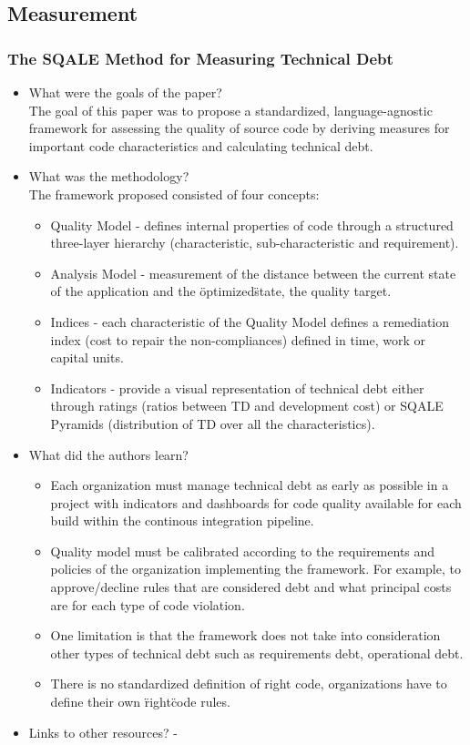 \documentclass{mprop}
\begin{document}
\subsection{Measurement}

\subsubsection{The SQALE Method for Measuring Technical Debt} \cite{Letouzey2012}

\begin{itemize}
	\item What were the goals of the paper? \\
		The goal of this paper was to propose a standardized, language-agnostic framework for assessing the quality of source code by deriving measures for important code characteristics and calculating technical debt.
	\item What was the methodology? \\
		The framework proposed consisted of four concepts:
		\begin{itemize}
			\item Quality Model - defines internal properties of code through a structured three-layer hierarchy (characteristic, sub-characteristic and requirement).
			\item Analysis Model - measurement of the distance between the current state of the application and the \"optimized\" state, the quality target.
			\item Indices - each characteristic of the Quality Model defines a remediation index (cost to repair the non-compliances) defined in time, work or capital units.
			\item Indicators - provide a visual representation of technical debt either through ratings (ratios between TD and development cost) or SQALE Pyramids (distribution of TD over all the characteristics).
		\end{itemize}
	\item What did the authors learn?
		\begin{itemize}
			\item Each organization must manage technical debt as early as possible in a project with indicators and dashboards for code quality available for each build within the continous integration pipeline.
			\item Quality model must be calibrated according to the requirements and policies of the organization implementing the framework. For example, to approve/decline rules that are considered debt and what principal costs are for each type of code violation.
			\item One limitation is that the framework does not take into consideration other types of technical debt such as requirements debt, operational debt.
			\item There is no standardized definition of right code, organizations have to define their own \"right\" code rules.
		\end{itemize}
	\item Links to other resources?
		-
\end{itemize}
\end{document}

